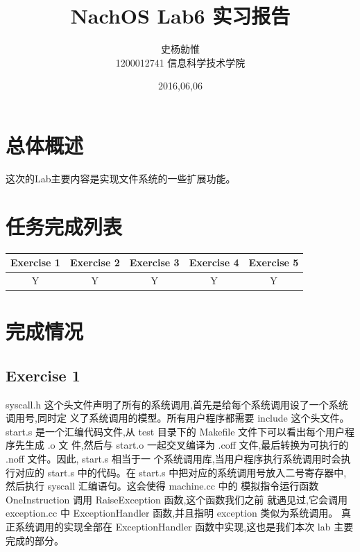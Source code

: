\documentclass[nofonts]{ctexart}
\begin{document}
\title{%
\vspace{-30mm}\Huge NachOS Lab6 实习报告 \vspace{10mm}}
\author{%
\Large 史杨勍惟 
\\[10mm] 1200012741 信息科学技术学院}
\date{2016,06,06}

\maketitle

\newpage
\tableofcontents
\newpage

\section{总体概述}
这次的Lab主要内容是实现文件系统的一些扩展功能。

\section{任务完成列表}
\begin{table}[h]
\footnotesize
\begin{tabular}{|c|c|c|c|c|}\hline
\textbf{Exercise 1} & \textbf{Exercise 2} &
\textbf{Exercise 3} & \textbf{Exercise 4} &
\textbf{Exercise 5}\\\hline
Y & Y & Y & Y & Y\\\hline


\end{tabular}


\end{table}
\section{完成情况}
\subsection*{Exercise 1}
syscall.h 这个头文件声明了所有的系统调用,首先是给每个系统调用设了一个系统调用号,同时定
义了系统调用的模型。所有用户程序都需要 include 这个头文件。
start.s 是一个汇编代码文件,从 test 目录下的 Makefile 文件下可以看出每个用户程序先生成 .o 文
件,然后与 start.o 一起交叉编译为 .coff 文件,最后转换为可执行的 .noff 文件。因此, start.s 相当于一
个系统调用库,当用户程序执行系统调用时会执行对应的 start.s 中的代码。在
start.s 中把对应的系统调用号放入二号寄存器中,然后执行 syscall 汇编语句。这会使得
machine.cc 中的 模拟指令运行函数 OneInstruction 调用 RaiseException 函数,这个函数我们之前
就遇见过,它会调用 exception.cc 中 ExceptionHandler 函数,并且指明 exception 类似为系统调用。
真正系统调用的实现全部在 ExceptionHandler 函数中实现,这也是我们本次 lab 主要完成的部分。
\end{document}
